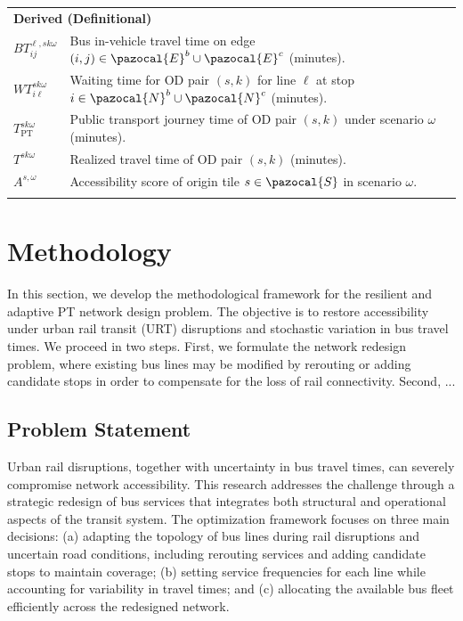 \documentclass[3p,times,procedia]{elsarticle}
\begin{document}
\begin{table}[h]
\begin{tabularx}{\hsize}{@{\extracolsep{\fill}}lX@{}}
\multicolumn{2}{l}{\textbf{Derived (Definitional)}} \\
$BT_{ij}^{\ell,sk\omega}$ & Bus in-vehicle travel time on edge $(i,j) \in \pazocal{E}^b \cup \pazocal{E}^c$ (minutes). \\
$WT_{i\ell}^{sk\omega}$ & Waiting time for OD pair $(s,k)$ for line $\ell$ at stop $i \in \pazocal{N}^b \cup \pazocal{N}^c$ (minutes). \\
$T^{sk\omega}_{\text{PT}}$ & Public transport journey time of OD pair $(s,k)$ under scenario $\omega$ (minutes). \\
$T^{sk\omega}$ & Realized travel time of OD pair $(s,k)$ (minutes). \\
$A^{s,\omega}$ & Accessibility score of origin tile $s \in \pazocal{S}$ in scenario $\omega$. \\
\botrule
\end{tabularx}
\end{table}


\section{Methodology}
In this section, we develop the methodological framework for the resilient and adaptive PT network design problem. 
The objective is to restore accessibility under urban rail transit (URT) disruptions and stochastic variation in bus travel times. 
%
We proceed in two steps. 
First, we formulate the network redesign problem, where existing bus lines may be modified by rerouting or adding candidate stops in order to compensate for the loss of rail connectivity. 
Second, 
% 
...


\subsection{Problem Statement}
Urban rail disruptions, together with uncertainty in bus travel times, can severely compromise network accessibility. This research addresses the challenge through a strategic redesign of bus services that integrates both structural and operational aspects of the transit system. The optimization framework focuses on three main decisions:
(a) adapting the topology of bus lines during rail disruptions and uncertain road conditions, including rerouting services and adding candidate stops to maintain coverage;
(b) setting service frequencies for each line while accounting for variability in travel times; and
(c) allocating the available bus fleet efficiently across the redesigned network.
\end{document}
